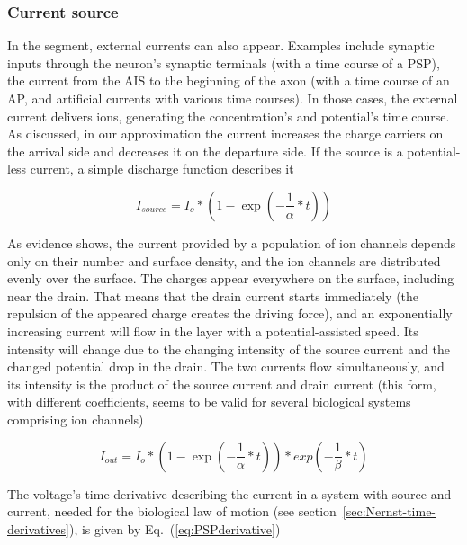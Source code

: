 \subsubsection[Source]{Current source\label{sec:Physics-CurrentSource}}

In the segment, external currents can also appear. Examples include
synaptic inputs through the neuron's synaptic terminals (with a time
course of a \gls{PSP}),
the current from the \gls{AIS} to the beginning
of the axon (with a time course of an 
\gls{AP}, and artificial currents
with various time courses). In those cases, the external current delivers
ions, generating the concentration's and potential's time course.
As discussed, in our approximation the current increases the charge
carriers on the arrival side and decreases it on the departure side.
If the source is a potential-less current, a simple discharge function
describes it

\begin{equation}
I_{source}=I_{o}*(1-\exp(-\frac{1}{\alpha}*t))\label{eq:I_Source}
\end{equation}

As evidence shows, the current provided by a population of ion channels
depends only on their number and surface density, and the ion channels
are distributed evenly over the surface. The charges appear everywhere
on the surface, including near the drain. That means that the drain
current starts immediately (the repulsion of the appeared charge creates
the driving force), and an exponentially increasing current will flow
in the layer with a potential-assisted speed. Its intensity will change
due to the changing intensity of the source current and the changed
potential drop in the drain. The two currents flow simultaneously,
and its intensity is the product of the source current and drain current
(this form, with different coefficients, seems to be valid for several
biological systems comprising ion channels)

\begin{equation}
I_{out}=I_{o}*(1-\exp(-\frac{1}{\alpha}*t))*exp(-\frac{1}{\beta}*t)\label{eq:I_Out}
\end{equation}

The voltage's time derivative describing the current in a system with source and current,
 needed for the biological law of motion (see section~\ref{sec:Nernst-time-derivatives}),
 is given by Eq.~(\ref{eq:PSPderivative})


